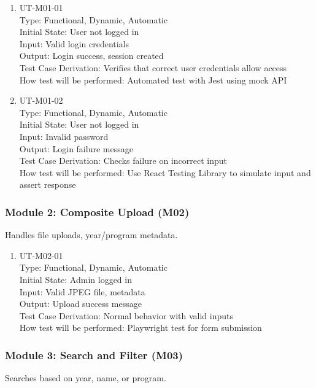 \documentclass[12pt, titlepage]{article}
\begin{document}
\begin{enumerate}
  \item{UT-M01-01\\}
  Type: Functional, Dynamic, Automatic\\
  Initial State: User not logged in\\
  Input: Valid login credentials\\
  Output: Login success, session created\\
  Test Case Derivation: Verifies that correct user credentials allow access\\
  How test will be performed: Automated test with Jest using mock API

  \item{UT-M01-02\\}
  Type: Functional, Dynamic, Automatic\\
  Initial State: User not logged in\\
  Input: Invalid password\\
  Output: Login failure message\\
  Test Case Derivation: Checks failure on incorrect input\\
  How test will be performed: Use React Testing Library to simulate input and assert response
\end{enumerate}

\subsubsection{Module 2: Composite Upload (M02)}
Handles file uploads, year/program metadata.

\begin{enumerate}
  \item{UT-M02-01\\}
  Type: Functional, Dynamic, Automatic\\
  Initial State: Admin logged in\\
  Input: Valid JPEG file, metadata\\
  Output: Upload success message\\
  Test Case Derivation: Normal behavior with valid inputs\\
  How test will be performed: Playwright test for form submission
\end{enumerate}

\subsubsection{Module 3: Search and Filter (M03)}
Searches based on year, name, or program.
\end{document}
